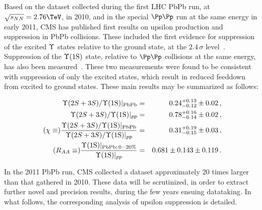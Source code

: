 Based on the dataset collected during the first LHC PbPb run, at $\sqrtsnn = 2.76\TeV$, in 2010, and in the special $\Pp\Pp$ run at the same energy in early 2011, CMS has published first results on upsilon production and suppression in PbPb collisions. 
%
These included the first evidence for suppression of the excited $\Upsilon$ states relative to the ground state, at the $2.4\,\sigma$ level~\cite{prl,QM2011}. 
Suppression of the $\Upsilon\text{(1S)}$ state, relative to $\Pp\Pp$ collisions at the same energy, has also been measured~\cite{QM2011,CMS_PAS_HIN-10-006}. 
These two measurements were found to be consistent with suppression of only the excited states, which result in reduced feeddown from excited to ground states. These main results may be summarized as follows:
%
\begin{linenomath}
\begin{eqnarray}
  \Upsilon(2S+3S)/\Upsilon\text{(1S)}|_{\text{PbPb}} & = & 0.24 _{-0.12}^{+0.13} \pm 0.02\,, \nonumber \\
  \Upsilon(2S+3S)/\Upsilon\text{(1S)}|_{{pp}} & = & 0.78 _{-0.14}^{+0.16} \pm 0.02\,,  \nonumber \\
(\chi \equiv)
  \frac{\Upsilon(2S+3S)/\Upsilon\text{(1S)}|_{\text{PbPb}}}{\Upsilon(2S+3S)/\Upsilon\text{(1S)}|_{{pp}}}
 & = & 0.31 _{-0.15}^{+0.19} \pm 0.03 \,,  \nonumber \\
(R_{AA} \equiv)
 \frac{\Upsilon\text{(1S)}|_{\text{PbPb};\, 0-20\%}}{\Upsilon\text{(1S)}|_{{pp}}}
& = & 0.681 \pm 0.143 \pm 0.119 \,.  \nonumber
\end{eqnarray}
\end{linenomath}

In the 2011 PbPb run, CMS collected a dataset approximately 20 times larger than that gathered in 2010. 
These data will be scrutinized, in order to extract further novel and precision results, during the few years ensuing datataking.
In what follows, the corresponding analysis of upsilon suppression is detailed. 
